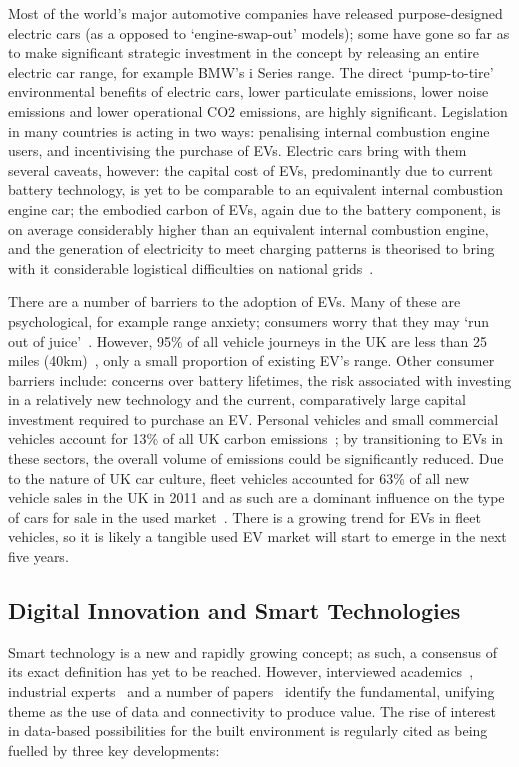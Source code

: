 \documentclass[journal]{IEEEtran}
\begin{document}
Most of the world's major automotive companies have released
purpose-designed electric cars (as a opposed to `engine-swap-out'
models); some have gone so far as to make significant strategic
investment in the concept by releasing an entire electric car range,
for example BMW's i Series range. The direct `pump-to-tire'
environmental benefits of electric cars, lower particulate emissions,
lower noise emissions and lower operational CO2 emissions, are highly
significant. Legislation in many countries is acting in two ways:
penalising internal combustion engine users, and incentivising the
purchase of EVs. Electric cars bring with them several caveats,
however: the capital cost of EVs, predominantly due to current battery
technology, is yet to be comparable to an equivalent internal
combustion engine car; the embodied carbon of EVs, again due to the
battery component, is on average considerably higher than an
equivalent internal combustion engine, and the generation of
electricity to meet charging patterns is theorised to bring with it
considerable logistical difficulties on national
grids~\cite{akhavan-rezai-et-al:2015}.

There are a number of barriers to the adoption of EVs. Many of these
are psychological, for example range anxiety; consumers worry that
they may `run out of juice'~\cite{oflev:2011}. However, 95\% of all
vehicle journeys in the UK are less than 25 miles
(40km)~\cite{oflev:2011}, only a small proportion of existing EV's
range. Other consumer barriers include: concerns over battery
lifetimes, the risk associated with investing in a relatively new
technology and the current, comparatively large capital investment
required to purchase an EV.  Personal vehicles and small commercial
vehicles account for 13\% of all UK carbon
emissions~\cite{lumsden:2012}; by transitioning to EVs in these
sectors, the overall volume of emissions could be significantly
reduced. Due to the nature of UK car culture, fleet vehicles accounted
for 63\% of all new vehicle sales in the UK in 2011 and as such are a
dominant influence on the type of cars for sale in the used
market~\cite{fleets:2012}. There is a growing trend for EVs in fleet
vehicles, so it is likely a tangible used EV market will start to
emerge in the next five years.


\subsection{Digital Innovation and Smart Technologies}

Smart technology is a new and rapidly growing concept; as such, a
consensus of its exact definition has yet to be reached. However,
interviewed academics~\cite{elecgen:2013}, industrial
experts~\cite{buscher:2014} and a number of
papers~\cite{komninos:2002,arup-et-al:2011,harrison+abbottdonnelly:2011,batty-et-al:2012}
identify the fundamental, unifying theme as the use of data and
connectivity to produce value. The rise of interest in data-based
possibilities for the built environment is regularly cited as being
fuelled by three key developments:
\end{document}
